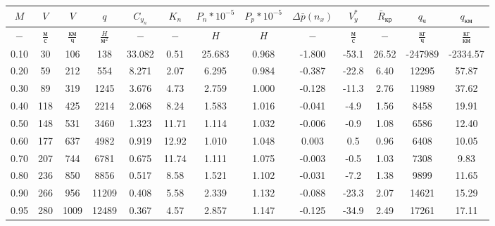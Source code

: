 \begin{tabular}{|c|c|c|c|c|c|c|c|c|c|c|c|c|}
\hline
$M$ & $V$ & $V$ & $q$ & $C_{y_n}$ & $K_n$ & $P_n*10^{-5}$ & $P_p*10^{-5}$ & $\Delta \bar{p}(n_x)$ & $V_y^*$ & $\bar{R}_{кр}$ & $q_{ч}$ & $q_{км}$ \\ 
\hline
$-$ & $\frac{м}{с}$ & $\frac{км}{ч}$ & $\frac{H}{м^2}$ & $-$ & $-$ & $H$ & $H$ & $-$ & $\frac{м}{с}$ & $-$ & $\frac{кг}{ч}$ & $\frac{кг}{км}$ \\ 
\hline
0.10 & 30 & 106 & 138 & 33.082 & 0.51 & 25.683 & 0.968 & -1.800 & -53.1 & 26.52 & -247989 & -2334.57 \\ 
\hline
0.20 & 59 & 212 & 554 & 8.271 & 2.07 & 6.295 & 0.984 & -0.387 & -22.8 & 6.40 & 12295 & 57.87 \\ 
\hline
0.30 & 89 & 319 & 1245 & 3.676 & 4.73 & 2.759 & 1.000 & -0.128 & -11.3 & 2.76 & 11989 & 37.62 \\ 
\hline
0.40 & 118 & 425 & 2214 & 2.068 & 8.24 & 1.583 & 1.016 & -0.041 & -4.9 & 1.56 & 8458 & 19.91 \\ 
\hline
0.50 & 148 & 531 & 3460 & 1.323 & 11.71 & 1.114 & 1.032 & -0.006 & -0.9 & 1.08 & 6586 & 12.40 \\ 
\hline
0.60 & 177 & 637 & 4982 & 0.919 & 12.92 & 1.010 & 1.048 & 0.003 & 0.5 & 0.96 & 6408 & 10.05 \\ 
\hline
0.70 & 207 & 744 & 6781 & 0.675 & 11.74 & 1.111 & 1.075 & -0.003 & -0.5 & 1.03 & 7308 & 9.83 \\ 
\hline
0.80 & 236 & 850 & 8856 & 0.517 & 8.58 & 1.521 & 1.102 & -0.031 & -7.2 & 1.38 & 9899 & 11.65 \\ 
\hline
0.90 & 266 & 956 & 11209 & 0.408 & 5.58 & 2.339 & 1.132 & -0.088 & -23.3 & 2.07 & 14621 & 15.29 \\ 
\hline
0.95 & 280 & 1009 & 12489 & 0.367 & 4.57 & 2.857 & 1.147 & -0.125 & -34.9 & 2.49 & 17261 & 17.11 \\ 
\hline
\end{tabular}